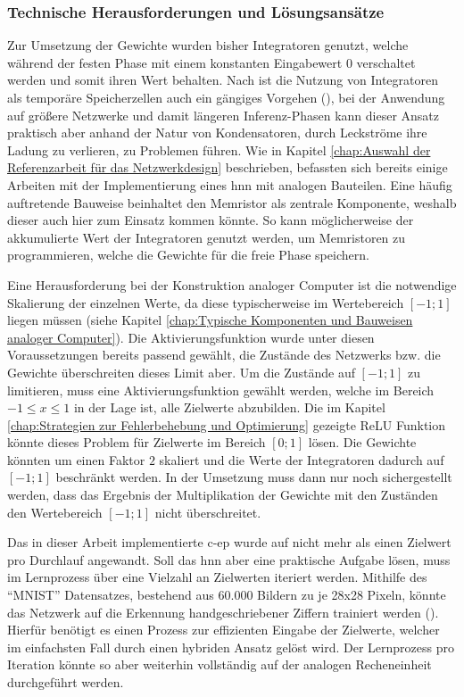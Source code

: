 \subsubsection{Technische Herausforderungen und Lösungsansätze}
\label{chap:Technische Herausforderungen und Lösungsansätze}

Zur Umsetzung der Gewichte wurden bisher Integratoren genutzt, welche während der festen Phase mit einem konstanten Eingabewert \(0\) verschaltet werden und somit ihren Wert behalten. Nach \citeauthor{Ulmann2022} ist die Nutzung von Integratoren als temporäre Speicherzellen auch ein gängiges Vorgehen (\cite[vgl. S. 92]{Ulmann2022}), bei der Anwendung auf größere Netzwerke und damit längeren Inferenz-Phasen kann dieser Ansatz praktisch aber anhand der Natur von Kondensatoren, durch Leckströme ihre Ladung zu verlieren, zu Problemen führen. Wie in Kapitel \ref{chap:Auswahl der Referenzarbeit für das Netzwerkdesign} beschrieben, befassten sich bereits einige Arbeiten mit der Implementierung eines \ac{hnn} mit analogen Bauteilen. Eine häufig auftretende Bauweise beinhaltet den Memristor als zentrale Komponente, weshalb dieser auch hier zum Einsatz kommen könnte. So kann möglicherweise der akkumulierte Wert der Integratoren genutzt werden, um Memristoren zu programmieren, welche die Gewichte für die freie Phase speichern.

Eine Herausforderung bei der Konstruktion analoger Computer ist die notwendige Skalierung der einzelnen Werte, da diese typischerweise im Wertebereich \([-1;1]\) liegen müssen (siehe Kapitel \ref{chap:Typische Komponenten und Bauweisen analoger Computer}). Die Aktivierungsfunktion wurde unter diesen Voraussetzungen bereits passend gewählt, die Zustände des Netzwerks bzw. die Gewichte überschreiten dieses Limit aber. Um die Zustände auf \([-1;1]\) zu limitieren, muss eine Aktivierungsfunktion gewählt werden, welche im Bereich \(-1\leq x\leq 1\) in der Lage ist, alle Zielwerte abzubilden. Die im Kapitel \ref{chap:Strategien zur Fehlerbehebung und Optimierung} gezeigte ReLU Funktion könnte dieses Problem für Zielwerte im Bereich \([0;1]\) lösen. Die Gewichte könnten \zb um einen Faktor \(2\) skaliert und die Werte der Integratoren dadurch auf \([-1;1]\) beschränkt werden. In der Umsetzung muss dann nur noch sichergestellt werden, dass das Ergebnis der Multiplikation der Gewichte mit den Zuständen den Wertebereich \([-1;1]\) nicht überschreitet.

Das in dieser Arbeit implementierte \ac{c-ep} wurde auf nicht mehr als einen Zielwert pro Durchlauf angewandt. Soll das \ac{hnn} aber eine praktische Aufgabe lösen, muss im Lernprozess über eine Vielzahl an Zielwerten iteriert werden. Mithilfe des "`MNIST"' Datensatzes, bestehend aus 60.000 Bildern zu je 28x28 Pixeln, könnte das Netzwerk \zb auf die Erkennung handgeschriebener Ziffern trainiert werden (\cite{Deng2012}). Hierfür benötigt es einen Prozess zur effizienten Eingabe der Zielwerte, welcher im einfachsten Fall durch einen hybriden Ansatz gelöst wird. Der Lernprozess pro Iteration könnte so aber weiterhin vollständig auf der analogen Recheneinheit durchgeführt werden.
